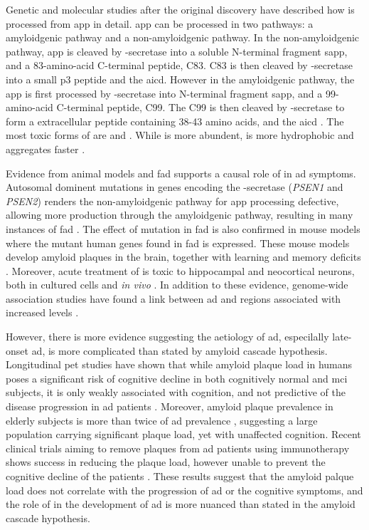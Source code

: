 Genetic and molecular studies after the original discovery have described how \abeta{} is processed from \gls{app} in detail. \Gls{app} can be processed in two pathways: a amyloidgenic pathway and a non-amyloidgenic pathway. In the non-amyloidgenic pathway, \gls{app} is cleaved by \textalpha-secretase into a soluble N-terminal fragment s\gls{app}\textalpha, and a 83-amino-acid C-terminal peptide, C83. C83 is then cleaved by \textgamma-secretase into a small p3 peptide and the \gls{aicd}. However in the amyloidgenic pathway, the \gls{app} is first processed by \textbeta-secretase into N-terminal fragment s\gls{app}\textbeta, and a 99-amino-acid C-terminal peptide, C99. The C99 is then cleaved by \textgamma-secretase to form a extracellular peptide containing 38-43 amino acids, \abeta{} and the \gls{aicd} \citep{barage15}. The most toxic forms of \abeta{} are \abeta[40] and \abeta[42]. While \abeta[40] is more abundent, \abeta[42] is more hydrophobic and aggregates faster \citep{walsh07}. 

Evidence from animal models and \gls{fad} supports a causal role of \abeta{} in \gls{ad} symptoms. Autosomal dominent mutations in genes encoding the \textgamma-secretase (\textit{PSEN1} and \textit{PSEN2}) renders the non-amyloidgenic pathway for \gls{app} processing defective, allowing more \abeta{} production through the amyloidgenic pathway, resulting in many instances of \gls{fad} \citep{suzuki94, levy-lahad95, rogaev95}. The effect of mutation in \gls{fad} is also confirmed in mouse models where the mutant human genes found in \gls{fad} is expressed. These mouse models develop amyloid plaques in the brain, together with learning and memory deficits \citep{hsiao96, dodart99, chishti01, westerman02}. Moreover, acute treatment of \abeta{} is toxic to hippocampal and neocortical neurons, both in cultured cells and \textit{in vivo} \citep{lacor04, shankar08}. In addition to these evidence, genome-wide association studies have found a link between \gls{ad} and regions associated with increased \abeta{} levels \citep{kehoe99, myers00}.

However, there is more evidence suggesting the aetiology of \gls{ad}, especilally late-onset \gls{ad}, is more complicated than stated by amyloid cascade hypothesis. Longitudinal \gls{pet} studies have shown that while amyloid plaque load in humans poses a significant risk of cognitive decline in both cognitively normal and \gls{mci} subjects, it is only weakly associated with cognition, and not predictive of the disease progression in \gls{ad} patients \citep{chen14}. Moreover, amyloid plaque prevalence in elderly subjects is more than twice of \gls{ad} prevalence \citep{rowe10, ad16}, suggesting a large population carrying significant plaque load, yet with unaffected cognition. Recent clinical trials aiming to remove plaques from \gls{ad} patients using immunotherapy shows success in reducing the plaque load, however unable to prevent the cognitive decline of the patients \citep{farlow15, siemers16, sevigny16}. These results suggest that the amyloid palque load does not correlate with the progression of \gls{ad} or the cognitive symptoms, and the role of \abeta{} in the development of \gls{ad} is more nuanced than stated in the amyloid cascade hypothesis. 

